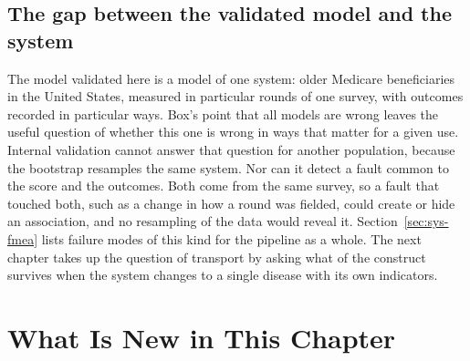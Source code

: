 \subsection*{The gap between the validated model and the system}

The model validated here is a model of one system: older Medicare beneficiaries in the United States, measured in particular rounds of one survey, with outcomes recorded in particular ways. Box's point that all models are wrong \citep{box_1976} leaves the useful question of whether this one is wrong in ways that matter for a given use. Internal validation cannot answer that question for another population, because the bootstrap resamples the same system. Nor can it detect a fault common to the score and the outcomes. Both come from the same survey, so a fault that touched both, such as a change in how a round was fielded, could create or hide an association, and no resampling of the data would reveal it. Section~\ref{sec:sys-fmea} lists failure modes of this kind for the pipeline as a whole. The next chapter takes up the question of transport by asking what of the construct survives when the system changes to a single disease with its own indicators.

\section*{What Is New in This Chapter}

